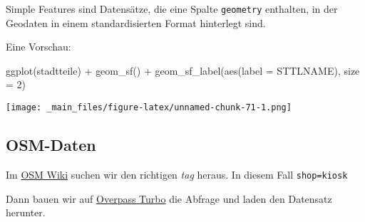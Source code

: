\documentclass[11pt,german,a4paper]{article}
\newenvironment{Shaded}{\begin{snugshade}}{\end{snugshade}}
\newcommand{\AttributeTok}[1]{\textcolor[rgb]{0.77,0.63,0.00}{#1}}
\newcommand{\DecValTok}[1]{\textcolor[rgb]{0.00,0.00,0.81}{#1}}
\newcommand{\DocumentationTok}[1]{\textcolor[rgb]{0.56,0.35,0.01}{\textbf{\textit{#1}}}}
\newcommand{\FunctionTok}[1]{\textcolor[rgb]{0.00,0.00,0.00}{#1}}
\newcommand{\NormalTok}[1]{#1}
\newcommand{\SpecialCharTok}[1]{\textcolor[rgb]{0.00,0.00,0.00}{#1}}
\begin{document}
Simple Features sind Datensätze, die eine Spalte \texttt{geometry} enthalten, in der Geodaten in einem standardisierten Format hinterlegt sind.

\begin{Shaded}
\end{Shaded}

Eine Vorschau:

\begin{Shaded}
\begin{Highlighting}[]
\FunctionTok{ggplot}\NormalTok{(stadtteile) }\SpecialCharTok{+}
  \FunctionTok{geom\_sf}\NormalTok{() }\SpecialCharTok{+}
  \FunctionTok{geom\_sf\_label}\NormalTok{(}\FunctionTok{aes}\NormalTok{(}\AttributeTok{label =}\NormalTok{ STTLNAME), }\AttributeTok{size =} \DecValTok{2}\NormalTok{)}
\end{Highlighting}
\end{Shaded}

\texttt{[image: \_main\_files/figure-latex/unnamed-chunk-71-1.png]}

\hypertarget{osm-daten}{%
\subsection{OSM-Daten}\label{osm-daten}}

Im \href{https://wiki.openstreetmap.org/wiki/Map_Features}{OSM Wiki} suchen wir den richtigen \emph{tag} heraus. In diesem Fall \texttt{shop=kiosk}

Dann bauen wir auf \href{https://overpass-turbo.eu/}{Overpass Turbo} die Abfrage und laden den Datensatz herunter.
\end{document}
